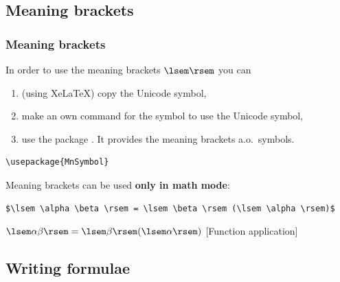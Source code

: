 \subsection{Meaning brackets}

\begin{frame}[fragile]
\frametitle{Meaning brackets}

In order to use the meaning brackets $\lsem \rsem$ you can 

\begin{enumerate}
	\item (using Xe\LaTeX ) copy the Unicode symbol,
	
	\item make an own command for the symbol to use the Unicode symbol,
	
	\item use the package  . It provides the meaning brackets a.o.\ symbols.
\end{enumerate}


\begin{lstlisting}
\usepackage{MnSymbol} 
\end{lstlisting}

\bigskip

Meaning brackets can be used \textbf{only in math mode}:

\begin{lstlisting}
$\lsem \alpha \beta \rsem = \lsem \beta \rsem (\lsem \alpha \rsem)$
\end{lstlisting}

\ea $\lsem \alpha \beta \rsem = \lsem \beta \rsem (\lsem \alpha \rsem)$ \hfill [Function application]
\z 

\end{frame}


\subsection{Writing formulae}

